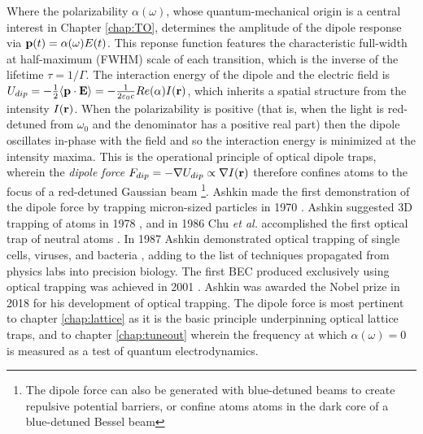 	Where the polarizability $\alpha(\omega)$, whose quantum-mechanical origin is a central interest in Chapter \ref{chap:TO}, determines the amplitude of the dipole response via $\textbf{p}(t) = \alpha(\omega)E(t)$.
	This reponse function features the characteristic full-width at half-maximum (FWHM) scale of each transition, which is the inverse of the lifetime $\tau=1/\Gamma$.
	The interaction energy of the dipole and the electric field is $U_{dip} = -\frac{1}{2}\langle\textbf{p}\cdot\textbf{E}\rangle = -\frac{1}{2\varepsilon_0 c}Re(\alpha)I(\textbf{r})$, which inherits a spatial structure from the intensity $I(\textbf{r})$.
	When the polarizability is positive (that is, when the light is red-detuned from $\omega_0$ and the denominator has a positive real part) then the dipole oscillates in-phase with the field and so the interaction energy is minimized at the intensity maxima.
	This is the operational principle of optical dipole traps, wherein the \emph{dipole force} $F_{dip} = -\nabla U_{dip} \propto \nabla I(\textbf{r})$ therefore confines atoms to the focus of a red-detuned Gaussian beam \footnote{The dipole force can also be generated with blue-detuned beams to create repulsive potential barriers, or confine atoms atoms in the dark core of a blue-detuned Bessel beam}.
	Ashkin made the first demonstration of the dipole force by trapping micron-sized particles in 1970 \cite{ashkin70}.
	Ashkin suggested 3D trapping of atoms in 1978 \cite{ashkin78}, and in 1986 Chu \emph{et al.} accomplished the first optical trap of neutral atoms \cite{chu86}. 
	In 1987 Ashkin demonstrated optical trapping of single cells, viruses, and bacteria \cite{ashkin87cell, ashkin87virus}, adding to the list of techniques propagated from physics labs into precision biology.
	The first BEC produced exclusively using optical trapping was achieved in 2001 \cite{barrett01}.
	Ashkin was awarded the Nobel prize in 2018 for his development of optical trapping.
	The dipole force is most pertinent to chapter \ref{chap:lattice} as it is the basic principle underpinning optical lattice traps, and to chapter \ref{chap:tuneout} wherein the frequency at which $\alpha(\omega)=0$ is measured as a test of quantum electrodynamics.
	


